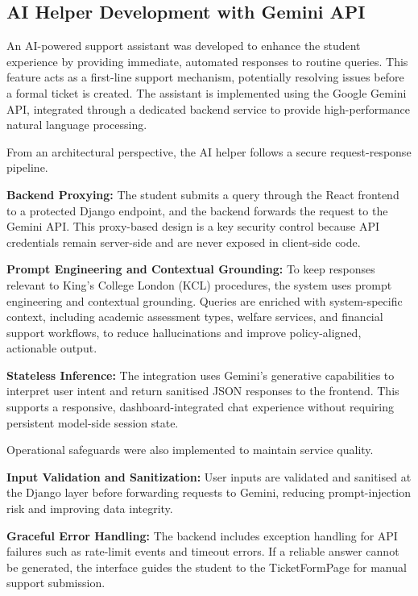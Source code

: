 \subsection{AI Helper Development with Gemini API}
\label{sec:ai-helper-gemini}
An AI-powered support assistant was developed to enhance the student experience by providing immediate, automated responses to routine queries. This feature acts as a first-line support mechanism, potentially resolving issues before a formal ticket is created. The assistant is implemented using the Google Gemini API, integrated through a dedicated backend service to provide high-performance natural language processing.

From an architectural perspective, the AI helper follows a secure request-response pipeline.

\textbf{Backend Proxying:} The student submits a query through the React frontend to a protected Django endpoint, and the backend forwards the request to the Gemini API. This proxy-based design is a key security control because API credentials remain server-side and are never exposed in client-side code.

\textbf{Prompt Engineering and Contextual Grounding:} To keep responses relevant to King's College London (KCL) procedures, the system uses prompt engineering and contextual grounding. Queries are enriched with system-specific context, including academic assessment types, welfare services, and financial support workflows, to reduce hallucinations and improve policy-aligned, actionable output.

\textbf{Stateless Inference:} The integration uses Gemini's generative capabilities to interpret user intent and return sanitised JSON responses to the frontend. This supports a responsive, dashboard-integrated chat experience without requiring persistent model-side session state.

Operational safeguards were also implemented to maintain service quality.

\textbf{Input Validation and Sanitization:} User inputs are validated and sanitised at the Django layer before forwarding requests to Gemini, reducing prompt-injection risk and improving data integrity.

\textbf{Graceful Error Handling:} The backend includes exception handling for API failures such as rate-limit events and timeout errors. If a reliable answer cannot be generated, the interface guides the student to the TicketFormPage for manual support submission.

